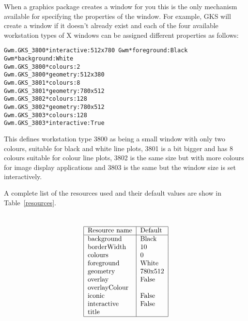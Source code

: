 When a graphics package creates a window for you this is the only mechanism
available for specifying the properties of the window. For example, GKS will
create a window if it doesn't already exist and each of the four available
workstation types of X windows can be assigned different properties as follows:
\begin{tabbing}
\tt Gwm.GKS\_3800*interactive:\quad\=\tt 512x780\kill
\tt Gwm*foreground:\>\tt Black\\
\tt Gwm*background:\>\tt White\\
\tt Gwm.GKS\_3800*colours:\>\tt 2\\
\tt Gwm.GKS\_3800*geometry:\>\tt 512x380\\
\tt Gwm.GKS\_3801*colours:\>\tt 8\\
\tt Gwm.GKS\_3801*geometry:\>\tt 780x512\\
\tt Gwm.GKS\_3802*colours:\>\tt 128\\
\tt Gwm.GKS\_3802*geometry:\>\tt 780x512\\
\tt Gwm.GKS\_3803*colours:\>\tt 128\\
\tt Gwm.GKS\_3803*interactive:\>\tt True\\
\end{tabbing}
This defines workstation type 3800 as being a small window with only two
colours, suitable for black and white line plots, 3801 is a bit bigger and has
8 colours suitable for colour line plots, 3802 is the same size but with more
colours for image display applications and 3803 is the same but the window size
is set interactively.

A complete list of the resources used and their default values are show in 
Table~\ref{resources}.
\begin{table}\label{resources}\caption{GWM X resources}\tt
\[\begin{tabular}{|l|l|}\hline
\rm Resource name &\rm Default\\ \hline
background &Black\\
borderWidth &10\\
colours & 0\\
foreground &White\\
geometry &780x512\\
overlay &False\\
overlayColour &\\
iconic &False\\
interactive &False\\
title &\\\hline 
\end{tabular}\]
\end{table}


